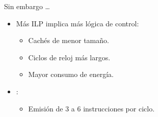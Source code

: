 \begin{frame}[t]{Sin embargo \ldots}
\begin{itemize}
  \item Más ILP implica más lógica de control:
    \begin{itemize}
      \item Cachés de menor tamaño.
      \item Ciclos de reloj más largos.
      \item Mayor consumo de energía.
    \end{itemize}

  \item {}:
    \begin{itemize}
      \item Emisión de 3 a 6 instrucciones por ciclo.
    \end{itemize}
\end{itemize}
\end{frame}
